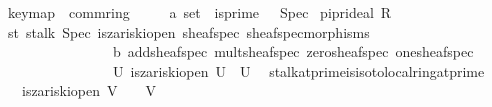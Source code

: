 \documentclass[12pt]{scrartcl}
\begin{document}
\begin{isabelle}
\isamarkupfalse%
\ key{\isacharunderscore}{\kern0pt}map\ {\isacharequal}{\kern0pt}\ comm{\isacharunderscore}{\kern0pt}ring\ {\isacharplus}{\kern0pt}\isanewline
\ \ \ {\isasympp}{\isacharcolon}{\kern0pt}{\isacharcolon}{\kern0pt}\ {\isachardoublequoteopen}{\isacharprime}{\kern0pt}a\ set{\isachardoublequoteclose}\ \ is{\isacharunderscore}{\kern0pt}prime{\isacharcolon}{\kern0pt}\ {\isachardoublequoteopen}{\isasympp}\ {\isasymin}\ Spec{\isachardoublequoteclose}\isanewline
{}\isanewline
\isanewline
{}\isamarkupfalse%
\ pi{\isacharcolon}{\kern0pt}pr{\isacharunderscore}{\kern0pt}ideal\ R\ {\isasympp}\ {\isachardoublequoteopen}{\isacharparenleft}{\kern0pt}{\isacharplus}{\kern0pt}{\isacharparenright}{\kern0pt}{\isachardoublequoteclose}\ {\isachardoublequoteopen}{\isacharparenleft}{\kern0pt}{\isasymcdot}{\isacharparenright}{\kern0pt}{\isachardoublequoteclose}\ {\isasymzero}\ {\isasymone}%
\isanewline
\isanewline
{}\isamarkupfalse%
\ st{\isacharcolon}{\kern0pt}\ stalk\ {\isachardoublequoteopen}Spec{\isachardoublequoteclose}\ is{\isacharunderscore}{\kern0pt}zariski{\isacharunderscore}{\kern0pt}open\ sheaf{\isacharunderscore}{\kern0pt}spec\ sheaf{\isacharunderscore}{\kern0pt}spec{\isacharunderscore}{\kern0pt}morphisms\isanewline
\ \ \ \ \ \ \ \ \ \ \ \ \ \ \ \ {\isasymO}b\ add{\isacharunderscore}{\kern0pt}sheaf{\isacharunderscore}{\kern0pt}spec\ mult{\isacharunderscore}{\kern0pt}sheaf{\isacharunderscore}{\kern0pt}spec\ zero{\isacharunderscore}{\kern0pt}sheaf{\isacharunderscore}{\kern0pt}spec\ one{\isacharunderscore}{\kern0pt}sheaf{\isacharunderscore}{\kern0pt}spec\isanewline
\ \ \ \ \ \ \ \ \ \ \ \ \ \ \ \ {\isachardoublequoteopen}{\isacharbraceleft}{\kern0pt}U{\isachardot}{\kern0pt}\ is{\isacharunderscore}{\kern0pt}zariski{\isacharunderscore}{\kern0pt}open\ U\ {\isasymand}\ {\isasympp}{\isasymin}U{\isacharbraceright}{\kern0pt}{\isachardoublequoteclose}\ {\isasympp}\isanewline
\isanewline
{}\isamarkupfalse%
\ stalk{\isacharunderscore}{\kern0pt}at{\isacharunderscore}{\kern0pt}prime{\isacharunderscore}{\kern0pt}is{\isacharunderscore}{\kern0pt}iso{\isacharunderscore}{\kern0pt}to{\isacharunderscore}{\kern0pt}local{\isacharunderscore}{\kern0pt}ring{\isacharunderscore}{\kern0pt}at{\isacharunderscore}{\kern0pt}prime{\isacharcolon}{\kern0pt}\isanewline
\ \ \ {\isachardoublequoteopen}is{\isacharunderscore}{\kern0pt}zariski{\isacharunderscore}{\kern0pt}open\ V{\isachardoublequoteclose}\ \ {\isachardoublequoteopen}{\isasympp}\ {\isasymin}\ V{\isachardoublequoteclose}\isanewline

\end{isabelle}
\end{document}
